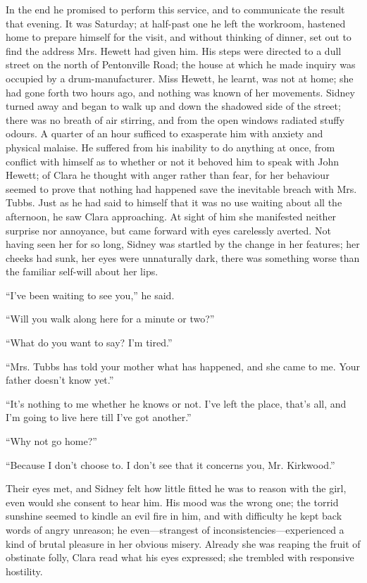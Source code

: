 In the end he promised to perform this
{\protect\hypertarget{222}{}{}}service, and to communicate the result
that evening. It was Saturday; at half-past one he left the workroom,
hastened home to prepare himself for the visit, and without thinking of
dinner, set out to find the address Mrs. Hewett had given him. His steps
were directed to a dull street on the north of Pentonville Road; the
house at which he made inquiry was occupied by a drum-manufacturer. Miss
Hewett, he learnt, was not at home; she had gone forth two hours ago,
and nothing was known of her movements. Sidney turned away and began to
walk up and down the shadowed side of the street; there was no breath of
air stirring, and from the open windows radiated stuffy odours. A
quarter of an hour sufficed to exasperate him with anxiety and physical
malaise. He suffered from his inability to do anything at once, from
conflict with himself as to whether or not it behoved him to speak with
John Hewett; of Clara he thought with anger rather than fear, for her
behaviour seemed to prove that nothing had happened save the
{\protect\hypertarget{223}{}{}}inevitable breach with Mrs. Tubbs. Just
as he had said to himself that it was no use waiting about all the
afternoon, he saw Clara approaching. At sight of him she manifested
neither surprise nor annoyance, but came forward with eyes carelessly
averted. Not having seen her for so long, Sidney was startled by the
change in her features; her cheeks had sunk, her eyes were unnaturally
dark, there was something worse than the familiar self-will about her
lips.

``I've been waiting to see you,'' he said.

``Will you walk along here for a minute or two?''

``What do you want to say? I'm tired.''

``Mrs. Tubbs has told your mother what has happened, and she came to me.
Your father doesn't know yet.''

``It's nothing to me whether he knows or not. I've left the place,
that's all, and I'm going to live here till I've got another.''

``Why not go home?''

``Because I don't choose to. I don't see that it concerns you, Mr.
Kirkwood.''

{\protect\hypertarget{224}{}{}}Their eyes met, and Sidney felt how
little fitted he was to reason with the girl, even would she consent to
hear him. His mood was the wrong one; the torrid sunshine seemed to
kindle an evil fire in him, and with difficulty he kept back words of
angry unreason; he even---strangest of inconsistencies---experienced a
kind of brutal pleasure in her obvious misery. Already she was reaping
the fruit of obstinate folly, Clara read what his eyes expressed; she
trembled with responsive hostility.

